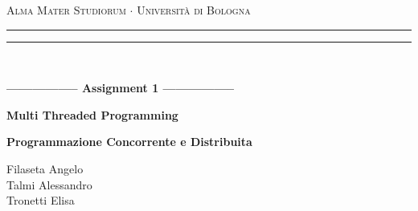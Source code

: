 \begin{titlepage}
    \begin{center}
        {{\Large{\textsc{Alma Mater Studiorum $\cdot$ Università di Bologna}}}}
        \rule[0.1cm]{15.8cm}{0.1mm}
        \rule[0.5cm]{15.8cm}{0.6mm}
        \\
        \vspace{3mm}
    \end{center}
    \vspace{2mm}
    \begin{center}
        {\LARGE{\bf{----------------- Assignment 1 -----------------}}}
        \vspace{5mm} \par \noindent
        {\Huge{\bf{Multi Threaded Programming}}}
        \vspace{10mm} \par \noindent
        {\LARGE \textbf{Programmazione Concorrente e Distribuita}}
        \vspace{15mm} \par \noindent
        {\Large Filaseta Angelo\\
        Talmi Alessandro\\
        Tronetti Elisa\\}
    \end{center}
    \hfill
    \vspace{40mm}
\end{titlepage}
